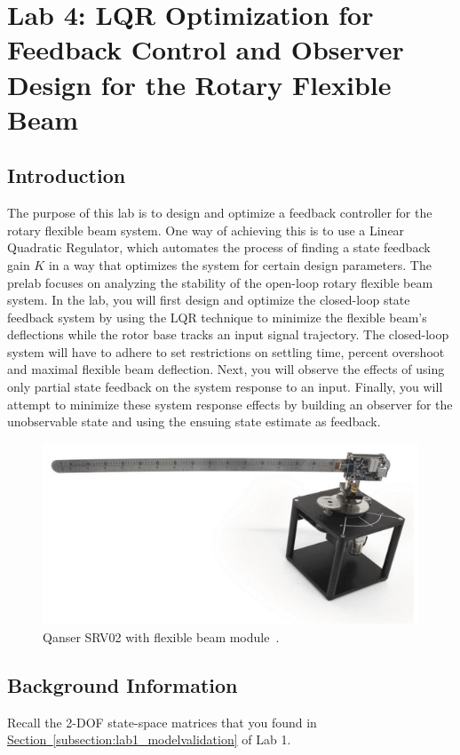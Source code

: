 \chapter{Lab 4: LQR Optimization for Feedback Control and Observer Design for the Rotary Flexible Beam}

\section{Introduction}\label{section:lab4_intro}

The purpose of this lab is to design and optimize a feedback controller for the rotary flexible beam system. One way of achieving this is to use a Linear Quadratic Regulator, which automates the process of finding a state feedback gain $K$ in a way that optimizes the system for certain design parameters. The prelab focuses on analyzing the stability of the open-loop rotary flexible beam system. In the lab, you will first design and optimize the closed-loop state feedback system by using the LQR technique to minimize the flexible beam's deflections while the rotor base tracks an input signal trajectory. The closed-loop system will have to adhere to set restrictions on settling time, percent overshoot and maximal flexible beam deflection. Next, you will observe the effects of using only partial state feedback on the system response to an input. Finally, you will attempt to minimize these system response effects by building an observer for the unobservable state and using the ensuing state estimate as feedback.
\begin{figure}[htb!]
    \centering
    \includegraphics[width=.6\linewidth]{eps/lab_1/quanser.eps}
    \caption{Qanser SRV02 with flexible beam module~\cite{Q-Flex-Beam}.}
    \label{fig:lab4_plant}
\end{figure}

\section{Background Information}\label{section:lab4_prelab}
Recall the 2-DOF state-space matrices that you found in \hyperref[subsection:lab1_modelvalidation]{Section~\ref{subsection:lab1_modelvalidation}} of Lab 1.


